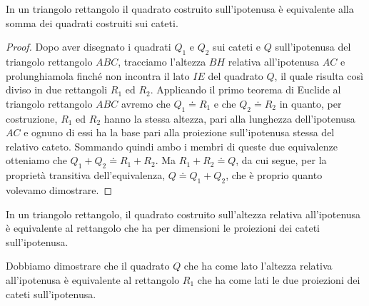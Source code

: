 \begin{teorema}[di Pitagora]
In un triangolo rettangolo il quadrato costruito sull'ipotenusa è 
equivalente alla somma dei quadrati costruiti sui cateti.
\end{teorema}

\noindent\begin{minipage}{0.55\textwidth}\parindent15pt
\begin{proof}
Dopo aver disegnato i quadrati $Q_1$ e $Q_2$ sui cateti e $Q$ 
sull'ipotenusa del triangolo rettangolo $ABC$, tracciamo l'altezza 
$BH$ relativa all'ipotenusa $AC$ e prolunghiamola finché non incontra 
il lato $IE$ del quadrato $Q$, il quale risulta così diviso in due 
rettangoli $R_1$ ed $R_2$.
Applicando il primo teorema di Euclide al triangolo rettangolo $ABC$ 
avremo che $Q_1\doteq R_1$ e che $Q_2\doteq R_2$ in quanto, per 
costruzione, $R_1$ ed $R_2$ hanno la stessa altezza, pari alla 
lunghezza dell'ipotenusa $AC$ e ognuno di essi ha la base pari alla 
proiezione sull'ipotenusa stessa del relativo cateto. Sommando quindi 
ambo i membri di queste due equivalenze otteniamo che $Q_1+Q_2\doteq 
R_1+R_2$. Ma $R_1+R_2\doteq Q$, da cui segue, per la proprietà 
transitiva dell'equivalenza, $Q\doteq Q_1+Q_2$, che è proprio quanto 
volevamo dimostrare.
\end{proof}
\end{minipage}\hfil
\begin{minipage}{0.45\textwidth}
  \centering
\end{minipage}\vspace{8pt}


\begin{teorema}
In un triangolo rettangolo, il quadrato costruito sull'altezza 
relativa all'ipotenusa è equivalente al rettangolo che ha per 
dimensioni le proiezioni dei cateti sull'ipotenusa.
\end{teorema}

Dobbiamo dimostrare che il quadrato $Q$ che ha come lato l'altezza 
relativa all'ipotenusa è equivalente al rettangolo $R_1$ che ha come 
lati le due proiezioni dei cateti sull'ipotenusa.


